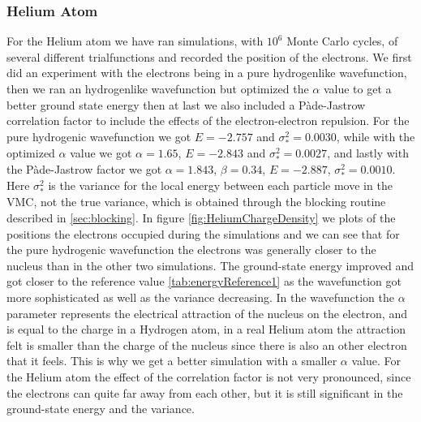 	\subsubsection{Helium Atom}
		For the Helium atom we have ran simulations, with \(10^6\) Monte Carlo cycles, of several different trialfunctions and recorded the position of the electrons. We first did an experiment with the electrons being in a pure hydrogenlike wavefunction, then we ran an hydrogenlike wavefunction but optimized the \(\alpha \) value to get a better ground state energy then at last we also included a Pàde-Jastrow correlation factor to include the effects of the electron-electron repulsion. For the pure hydrogenic wavefunction we got $E = -2.757$ and $\sigma^2_* = 0.0030$, while with the optimized \(\alpha\) value we got $\alpha = 1.65$, $E = -2.843$ and $\sigma^2_* = 0.0027$, and lastly with the Pàde-Jastrow factor we got $\alpha = 1.843$, $\beta = 0.34$, $E = -2.887$, $\sigma^2_* = 0.0010$. Here $\sigma^2_*$ is the variance for the local energy between each particle move in the VMC, not the true variance, which is obtained through the blocking routine described in \cref{sec:blocking}. In figure \ref{fig:HeliumChargeDensity} we plots of the positions the electrons occupied during the simulations and we can see that for the pure hydrogenic wavefunction the electrons was generally closer to the nucleus than in the other two simulations. The ground-state energy improved and got closer to the reference value \ref{tab:energyReference1} as the wavefunction got more sophisticated as well as the variance decreasing. In the wavefunction the $\alpha$ parameter represents the electrical attraction of the nucleus on the electron, and is equal to the charge in a Hydrogen atom, in a real Helium atom the attraction felt is smaller than the charge of the nucleus since there is also an other electron that it feels. This is why we get a better simulation with a smaller \(\alpha\) value. For the Helium atom the effect of the correlation factor is not very pronounced, since the electrons can quite far away from each other, but it is still significant in the ground-state energy and the variance.
